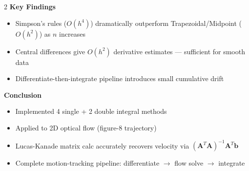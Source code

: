 \documentclass[a4paper,landscape,12pt]{extarticle}
\begin{document}
\begin{huge}
\begin{multicols}{2}
\textbf{Key Findings}
\begin{itemize}
  \item Simpson's rules ($O(h^4)$) dramatically outperform Trapezoidal/Midpoint ($O(h^2)$) as $n$ increases
  \item Central differences give $O(h^2)$ derivative estimates --- sufficient for smooth data
  \item Differentiate-then-integrate pipeline introduces small cumulative drift
\end{itemize}

\columnbreak

\textbf{Conclusion}
\begin{itemize}
  \item Implemented 4 single + 2 double integral methods
  \item Applied to 2D optical flow (figure-8 trajectory)
  \item Lucas-Kanade matrix calc accurately recovers velocity via $(\mathbf{A}^T\mathbf{A})^{-1}\mathbf{A}^T\mathbf{b}$
  \item Complete motion-tracking pipeline: differentiate $\to$ flow solve $\to$ integrate
\end{itemize}
\end{multicols}

\leftskip 0in \rightskip 0in

\end{huge}
\end{document}
